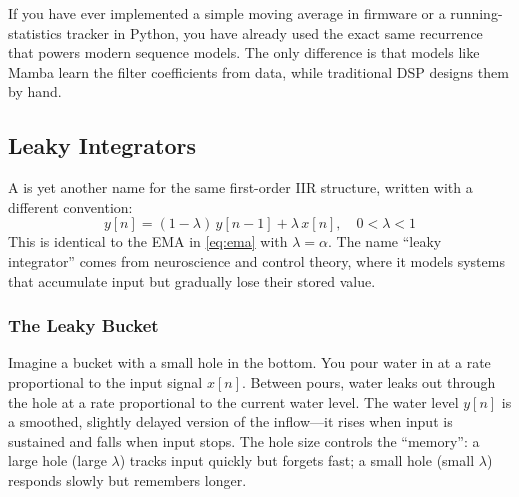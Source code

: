 \begin{engineernote}
If you have ever implemented a simple moving average in firmware or a
running-statistics tracker in Python, you have already used the exact
same recurrence that powers modern sequence models. The only
difference is that models like Mamba learn the filter coefficients
from data, while traditional DSP designs them by hand.
\end{engineernote}

\subsection{Leaky Integrators}
\label{sec:dsp-leaky}

A  is yet another name for the same
first-order IIR structure, written with a different convention:
%
\begin{equation}
  y[n] = (1 - \lambda) \, y[n-1] + \lambda \, x[n],
  \quad 0 < \lambda < 1
  \label{eq:leaky-integrator}
\end{equation}
%
This is identical to the EMA in \cref{eq:ema} with $\lambda = \alpha$.
The name ``leaky integrator'' comes from neuroscience and control
theory, where it models systems that accumulate input but gradually
lose their stored value.

\subsubsection{The Leaky Bucket}

\begin{analogy}
Imagine a bucket with a small hole in the bottom. You pour water in
at a rate proportional to the input signal $x[n]$. Between pours,
water leaks out through the hole at a rate proportional to the current
water level. The water level $y[n]$ is a smoothed, slightly delayed
version of the inflow---it rises when input is sustained and falls
when input stops. The hole size controls the ``memory'': a large hole
(large $\lambda$) tracks input quickly but forgets fast; a small hole
(small $\lambda$) responds slowly but remembers longer.
\end{analogy}

